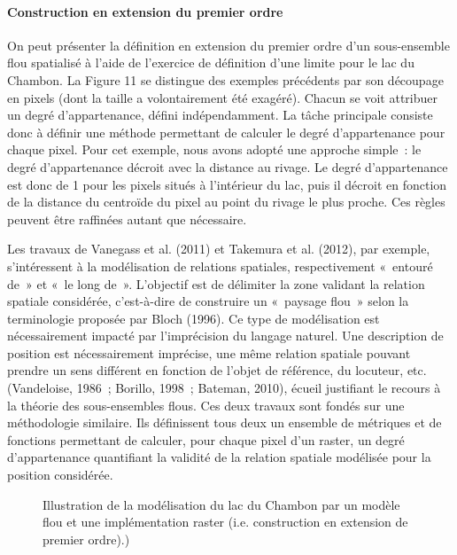 \paragraph{Construction en extension du premier ordre}

On peut présenter la définition en extension du premier ordre d’un
sous-ensemble flou spatialisé à l’aide de l’exercice de définition
d’une limite pour le lac du Chambon. La Figure 11 se distingue des
exemples précédents par son découpage en pixels (dont la taille a
volontairement été exagéré). Chacun se voit attribuer un degré
d’appartenance, défini indépendamment. La tâche principale consiste
donc à définir une méthode permettant de calculer le degré
d’appartenance pour chaque pixel. Pour cet exemple, nous avons adopté
une approche simple : le degré d’appartenance décroit avec la distance
au rivage. Le degré d’appartenance est donc de 1 pour les pixels
situés à l’intérieur du lac, puis il décroit en fonction de la
distance du centroïde du pixel au point du rivage le plus proche. Ces
règles peuvent être raffinées autant que nécessaire.

Les travaux de Vanegass et al. (2011) et Takemura et al. (2012), par
exemple, s’intéressent à la modélisation de relations spatiales,
respectivement « entouré de » et « le long de ». L’objectif est de
délimiter la zone validant la relation spatiale considérée,
c’est-à-dire de construire un « paysage flou » selon la terminologie
proposée par Bloch (1996). Ce type de modélisation est nécessairement
impacté par l’imprécision du langage naturel. Une description de
position est nécessairement imprécise, une même relation spatiale
pouvant prendre un sens différent en fonction de l’objet de référence,
du locuteur, etc. (Vandeloise, 1986 ; Borillo, 1998 ; Bateman, 2010),
écueil justifiant le recours à la théorie des sous-ensembles
flous. Ces deux travaux sont fondés sur une méthodologie
similaire. Ils définissent tous deux un ensemble de métriques et de
fonctions permettant de calculer, pour chaque pixel d’un raster, un
degré d’appartenance quantifiant la validité de la relation spatiale
modélisée pour la position considérée.

\begin{figure}
  \centering
  \caption{Illustration de la modélisation du lac du Chambon par un modèle flou et une implémentation raster (i.e. construction en extension de premier ordre).)}
  \label{fig:champ_raster}
\end{figure}

